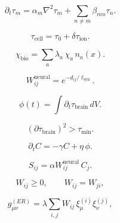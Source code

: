 \[
\partial_t \tau_m = \alpha_m \nabla^2 \tau_m + \sum_{n\neq m}\beta_{mn}\tau_n.
\]

\[
\tau_{\mathrm{cell}} = \tau_0 + \delta\tau_{\mathrm{ion}}.
\]

\[
\chi_{\mathrm{bio}} = \sum_a \lambda_a\, \chi_a\, n_a(x).
\]

\[
W_{ij}^{\mathrm{neural}} = e^{-d_{ij}/\ell_{\mathrm{syn}}}.
\]

\[
\phi(t) = \int \partial_t\tau_{\mathrm{brain}}\, dV.
\]

\[
(\partial\tau_{\mathrm{brain}})^2 > \tau_{\mathrm{min}}.
\]

\[
\partial_t C = -\gamma C + \eta\,\phi.
\]

\[
S_{ij} = \alpha W^{\mathrm{neural}}_{ij}\, C_j.
\]

\[
W_{ij} \ge 0,\qquad W_{ij}=W_{ji},
\]

\[
g^{(ER)}_{\mu\nu} = \lambda 
\sum_{i,j} W_{ij}\, \xi^{(i)}_\mu \xi^{(j)}_\nu,
\]

